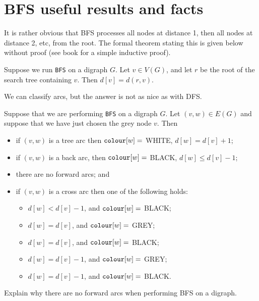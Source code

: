 \section{BFS useful results and facts} 
It is rather obvious that BFS processes all nodes at distance 1, then
all nodes at distance 2, etc, from the root. 
The formal theorem stating this is given below without proof (see book for a simple inductive proof).

\begin{Theorem} \label{thm:BFSdist}
Suppose we run \texttt{BFS} on a digraph $G$.
Let $v \in V(G)$, and let $r$ be the root of the search tree containing $v$. 
Then $d[v] = d(r, v)$.
\end{Theorem}

We can classify arcs, but the answer is not as nice as with DFS.

\begin{Theorem} \label{thm:BFS-arcclass}
Suppose that we are performing \texttt{BFS} on a digraph $G$. Let $(v,
w)\in E(G)$ and suppose that we have just chosen the grey node $v$. 
Then
\begin{itemize}
  \item if $(v, w)$ is a tree arc then $\operatorname{\text{\texttt{colour}}}[w] = $ WHITE, $d[w] = d[v] + 1$;
  \item if $(v, w)$ is a back arc, then $\operatorname{\text{\texttt{colour}}}[w] = $ BLACK, $d[w] \leq d[v] - 1$;  
  \item there are no forward arcs; and
  \item if $(v, w)$ is a cross arc then one of the following holds:
  \begin{itemize}
	\item $d[w] < d[v] - 1$, and $\operatorname{\text{\texttt{colour}}}[w] = $ BLACK;
	\item $d[w] = d[v]$, and $\operatorname{\text{\texttt{colour}}}[w] = $ GREY;
	\item $d[w] = d[v]$, and $\operatorname{\text{\texttt{colour}}}[w] = $ BLACK;
	\item $d[w] = d[v] - 1$, and $\operatorname{\text{\texttt{colour}}}[w] = $ GREY;
	\item $d[w] = d[v] - 1$, and $\operatorname{\text{\texttt{colour}}}[w] = $ BLACK.
  \end{itemize}
\end{itemize}
\end{Theorem}

\begin{Boxample}[6]
Explain why there are no forward arcs when performing BFS on a digraph.
\end{Boxample}

